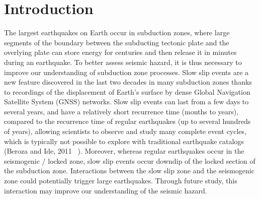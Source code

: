 \documentclass[draft]{agujournal2018}
\begin{document}
%
%
%
%


\section{Introduction}

The largest earthquakes on Earth occur in subduction zones, where large segments of the boundary between the subducting tectonic plate and the overlying plate can store energy for centuries and then release it in minutes during an earthquake. To better assess seismic hazard, it is thus necessary to improve our understanding of subduction zone processes. Slow slip events are a new feature discovered in the last two decades in many subduction zones thanks to recordings of the displacement of Earth's surface by dense Global Navigation Satellite System (GNSS) networks. Slow slip events can last from a few days to several years, and have a relatively short recurrence time (months to years), compared to the recurrence time of regular earthquakes (up to several hundreds of years), allowing scientists to observe and study many complete event cycles, which is typically not possible to explore with traditional earthquake catalogs (Beroza and Ide, 2011 ~\cite{BER_2011}).  Moreover, whereas regular earthquakes occur in the seismogenic / locked zone, slow slip events occur downdip of the locked section of the subduction zone. Interactions between the slow slip zone and the seismogenic zone could potentially trigger large earthquakes. Through future study, this interaction may improve our understanding of the seismic hazard.
\end{document}

